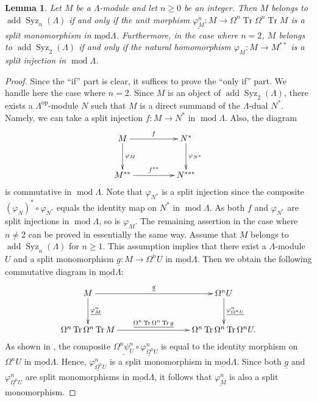\documentclass{amsart}
\newtheorem{lem}[thm]{Lemma}
\theoremstyle{definition}
\theoremstyle{remark}
\numberwithin{equation}{thm}
\def\add{\operatorname{add}}
\def\ge{\geqslant}
\def\lmod{\operatorname{\underline{mod}}}
\def\mod{\operatorname{mod}}
\def\syz{\Omega}
\def\Syz{\operatorname{Syz}}
\def\tr{\operatorname{Tr}}
\begin{document}
\begin{lem}\label{EGaddsyz}
Let $M$ be a $\Lambda$-module and let $n \ge 0$ be an integer.  
Then $M$ belongs to $\add\Syz_n(\Lambda)$ if and only if the unit morphism $\underline{\varphi^n_M} : M \to \syz^n \tr \syz^n \tr M$ is a split monomorphism in $\lmod\Lambda$.
Furthermore, in the case where $n = 2$, $M$ belongs to $\add\Syz_2(\Lambda)$ if and only if the natural homomorphism $\varphi_M : M \to M^{\ast\ast}$ is a split injection in $\mod\Lambda$.
\end{lem}

\begin{proof}
Since the “if” part is clear, it suffices to prove the “only if” part.  
We handle here the case where $n = 2$.  
Since $M$ is an object of $\add\Syz_2(\Lambda)$, there exists a $\Lambda^{\mathrm{op}}$-module $N$ such that $M$ is a direct summand of the $\Lambda$-dual $N^\ast$.  
Namely, we can take a split injection $f : M \to N^\ast$ in $\mod\Lambda$.  
Also, the diagram
$$
\xymatrix@R-1pc@C-1pc{
M\ar[rrr]^-{f}\ar[dd]^-{\varphi_M}&&&N^\ast\ar[dd]^-{\varphi_{N^\ast}}\\
&&&\\
M^{\ast\ast}\ar[rrr]^-{f^{\ast\ast}}&&&N^{\ast\ast\ast}
}
$$
is commutative in $\mod\Lambda$.  
Note that $\varphi_{N^\ast}$ is a split injection since the composite $(\varphi_N)^\ast \circ \varphi_{N^\ast}$ equals the identity map on $N^\ast$ in $\mod\Lambda$.  
As both $f$ and $\varphi_{N^\ast}$ are split injections in $\mod\Lambda$, so is $\varphi_M$.
The remaining assertion in the case where $n \ne 2$ can be proved in essentially the same way.  
Assume that $M$ belongs to $\add\Syz_n(\Lambda)$ for $n\ge1$.  
This assumption implies that there exist a $\Lambda$-module $U$ and a split monomorphism $\underline{g} : M \to \syz^n U$ in $\lmod\Lambda$.  
Then we obtain the following commutative diagram in $\lmod\Lambda$:
$$
\xymatrix@R-1pc@C-1pc{
M \ar[rrrrr]^-{\underline{g}} \ar[dd]^-{\underline{\varphi^n_M}} &&&&& \syz^n U \ar[dd]^-{\underline{\varphi^n_{\syz^n U}}} \\
&&&&& \\
\syz^n \tr \syz^n \tr M \ar[rrrrr]^-{\underline{\syz^n \tr \syz^n \tr g}} &&&&& \syz^n \tr \syz^n \tr \syz^n U.
}
$$
As shown in \cite[Page 63]{AB}, the composite $\underline{\syz^n \psi^n_{U}} \circ \underline{\varphi^n_{\syz^n U}}$ is equal to the identity morphism on $\syz^n U$ in $\lmod\Lambda$.  
Hence, $\underline{\varphi^n_{\syz^n U}}$ is a split monomorphism in $\lmod\Lambda$.  
Since both $\underline{g}$ and $\underline{\varphi^n_{\syz^n U}}$ are split monomorphisms in $\lmod\Lambda$, it follows that $\underline{\varphi^n_M}$ is also a split monomorphism.
\end{proof}
\end{document}
